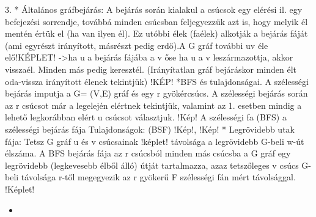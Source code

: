 \documentclass[../../szobeli.tex]{subfiles}
\begin{document}
\begin{center}
    \noindent{}
\end{center}

    3.
    * Általános gráfbejárás:  A bejárás során kialakul a csúcsok egy elérési il. egy befejezési sorrendje, továbbá minden csúcsban feljegyezzük azt is, hogy melyik él mentén értük el (ha van ilyen él). Ez utóbbi élek (faélek) alkotják a bejárás fáját (ami egyrészt irányított, másrészt  pedig erdő).A G gráf további uv éle elő!KÉPLET!  ->ha u a bejárás fájába a v őse ha u a v leszármazottja, akkor visszaél. Minden más pedig keresztél. (Irányítatlan gráf bejáráskor minden élt oda-vissza irányított élenek tekintjük) !KÉP!
    *BFS és tulajdonságai. A szélességi bejárás imputja a G= (V,E) gráf és egy r gyökércsúcs. A szélességi bejárás során az r csúcsot már a legelején elértnek tekintjük, valamint az 1. esetben mindig a lehető legkorábban elért u csúcsot választjuk. !Kép! A szélességi fa (BFS) a szélességi bejárás fája
    Tulajdonságok: (BSF) !Kép!, !Kép!
    * Legrövidebb utak fája: Tetsz G gráf u és v csúcsainak !képlet! távolsága a legrövidebb G-beli w-út élszáma. A BFS bejárás fája az r csúcsból minden más csúcsba a G gráf egy legrövidebb (legkevesebb élből álló) útját tartalmazza, azaz tetszőleges v csúcs G-beli távolsága r-től megegyezik az r gyökerű F szélességi fán mért távolsággal. !Képlet!


    \begin{itemize}
        \item 
    \end{itemize}
\end{document}
